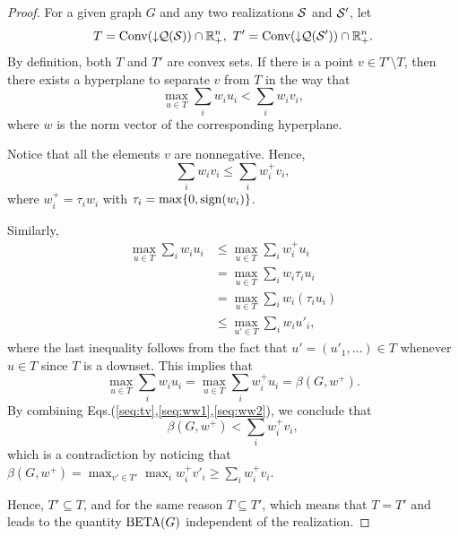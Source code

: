 \begin{proof}
    For a given graph $G$ and any two realizations ${\cal S}$ and ${\cal S}'$, let 
    \begin{equation}
        T = \conv(\downarrow\hspace{-0.3em} {\cal Q}({\cal S})) \cap \mathbb{R}_+^n,\ 
        T' = \conv(\downarrow\hspace{-0.3em} {\cal Q}({\cal S}')) \cap \mathbb{R}_+^n.
    \end{equation}
    By definition, both $T$ and $T'$ are convex sets. If there is a point $v \in T'\setminus T$, then there exists a hyperplane to separate $v$ from $T$ in the way that
    \begin{equation}\label{seq:tv}
        \max_{u\in T}\sum_i w_i u_i  < \sum_i w_i v_i,
    \end{equation}
    where $w$ is the norm vector of the corresponding hyperplane.

    Notice that all the elements  $v$ are nonnegative. Hence,
    \begin{equation}\label{seq:ww1}
        \sum_i w_i v_i \le \sum_i w^+_i v_i,
    \end{equation}
    where $w^+_i = \tau_i w_i$ with $\tau_i = \max\{0,{\rm sign}(w_i)\}$.

    Similarly,
    \begin{align}
        \max_{u\in T}\sum_i w_i u_i &\le \max_{u\in T}\sum_i w^+_i u_i\nonumber\\
        &= \max_{u\in T}\sum_{i} w_i \tau_{i} u_i\nonumber\\
        &= \max_{u\in T}\sum_{i} w_i (\tau_{i} u_i)\nonumber\\
        &\le \max_{u'\in T}\sum_{i} w_i u'_i,
    \end{align}
    where the last inequality follows from the fact that $u' = (u'_1,\ldots) \in T$ whenever $u \in T$ since $T$ is a downset. 
    This implies that
    \begin{equation}\label{seq:ww2}
        \max_{u\in T}\sum_i w_i u_i = \max_{u\in T}\sum_i w^+_i u_i = \beta(G,w^+).
    \end{equation}
    By combining Eqs.(\ref{seq:tv},\ref{seq:ww1},\ref{seq:ww2}), we conclude that
    \begin{equation}\label{eq:contradiction}
        \beta(G,w^+) < \sum_i w^+_i v_i,
    \end{equation}
    which is a contradiction by noticing that $ \beta(G,w^+) = \max_{v'\in T'} \max_i w^+_i v'_i \ge \sum_i w^+_i v_i$.

    Hence, $T'\subseteq T$, and for the same reason $T\subseteq T'$, which means that $T=T'$ and leads to the quantity $\operatorname{BETA}(G)$ independent of the realization.
\end{proof}
